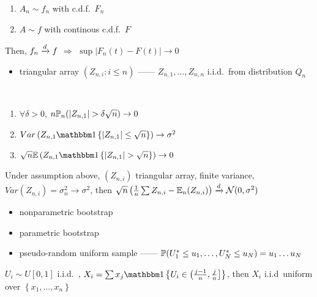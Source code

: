 \begin{example}[Bootstrap]
\begin{lemma}
        \begin{enumerate}
            \item $A_n \sim f_n$ with c.d.f.\ $F_{n}$
            \item $A \sim f$ with continous c.d.f.\ $F$
        \end{enumerate}
        Then, $f_n \xrightarrow{d} f$ $\Rightarrow$ $\sup |F_n(t) - F(t)| \rightarrow 0$
    \end{lemma}
    \begin{itemize}
        \item triangular array $(Z_{n, i}:i\leq n)$ ------ $Z_{n,1},\dots, Z_{n,n}$ i.i.d.\ from distribution $Q_n$
    \end{itemize}
    \begin{assumption}\,
        \begin{enumerate}
            \item $\forall \delta > 0$, $n\mathbb{P}_n(|Z_{n,1}| > \delta\sqrt{n}) \rightarrow 0$
            \item $Var\left( Z_{n,1} \In\left\{ |Z_{n, 1}| \leq \sqrt{n} \right\} \right) \rightarrow \sigma^2$
            \item $\sqrt{n}\Ex\left(Z_{n, 1} \In\left\{ |Z_{n, 1}| > \sqrt{n} \right\}\right) \rightarrow 0$
        \end{enumerate}
    \end{assumption}
    \begin{prop}
        Under assumption above, $(Z_{n, i})$ triangular array, finite variance, $Var(Z_{n, i}) = \sigma_n^2 \rightarrow \sigma^2$, then
        $\sqrt{n}\left(\frac{1}{n}\sum Z_{n,i} - \mathbb{E}_n(Z_{n,i})\right) \xrightarrow{d} \mathcal{N}(0, \sigma^2)$
    \end{prop}
    \begin{itemize}
        \item nonparametric bootstrap
        \item parametric bootstrap
    \end{itemize}
\end{example}

\begin{itemize}
    \item pseudo-random uniform sample ------ $\mathbb{P}(U^*_1 \leq u_1, \dots, U^*_N \leq u_N) = u_1\dots u_N$
\end{itemize}

\begin{prop}
    $U_i \sim U[0, 1]$ i.i.d.\ , $X_i = \sum x_j \In \left\{ U_i \in \left( \frac{j-1}{n}, \frac{j}{n}\right] \right\}$, then $X_i$ i.i.d\ uniform over $\left\{ x_1, \dots, x_n \right\}$
\end{prop}

